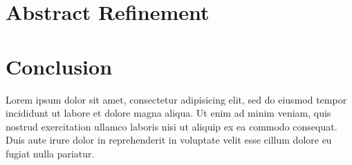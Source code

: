 \documentclass{article}
\begin{document}
\section{Abstract Refinement}

\section{Conclusion}

Lorem ipsum dolor sit amet, consectetur adipisicing elit, sed do eiusmod tempor
incididunt ut labore et dolore magna aliqua. Ut enim ad minim veniam, quis
nostrud exercitation ullamco laboris nisi ut aliquip ex ea commodo consequat.
Duis aute irure dolor in reprehenderit in voluptate velit esse cillum dolore eu
fugiat nulla pariatur.
%
%


 
\end{document}
